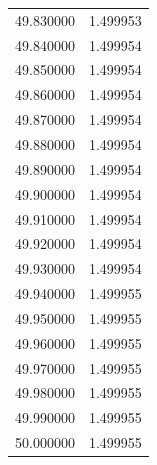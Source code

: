 \begin{tabular}{rr}
49.830000 & 1.499953 \\
49.840000 & 1.499954 \\
49.850000 & 1.499954 \\
49.860000 & 1.499954 \\
49.870000 & 1.499954 \\
49.880000 & 1.499954 \\
49.890000 & 1.499954 \\
49.900000 & 1.499954 \\
49.910000 & 1.499954 \\
49.920000 & 1.499954 \\
49.930000 & 1.499954 \\
49.940000 & 1.499955 \\
49.950000 & 1.499955 \\
49.960000 & 1.499955 \\
49.970000 & 1.499955 \\
49.980000 & 1.499955 \\
49.990000 & 1.499955 \\
50.000000 & 1.499955 \\
\bottomrule
\end{tabular}
